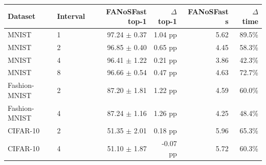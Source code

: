 \begin{tabular}{llrrrr}
\toprule
Dataset & Interval & FANoSFast top-1 & $\Delta$ top-1 & FANoSFast s & $\Delta$ time \\
\midrule
MNIST & 1 & 97.24 $\pm$ 0.37 & 1.04 pp & 5.62 & 89.5\% \\
MNIST & 2 & 96.85 $\pm$ 0.40 & 0.65 pp & 4.45 & 58.3\% \\
MNIST & 4 & 96.41 $\pm$ 1.22 & 0.21 pp & 3.86 & 42.3\% \\
MNIST & 8 & 96.66 $\pm$ 0.54 & 0.47 pp & 4.63 & 72.7\% \\
Fashion-MNIST & 2 & 87.20 $\pm$ 1.81 & 1.22 pp & 4.59 & 60.0\% \\
Fashion-MNIST & 4 & 87.24 $\pm$ 1.16 & 1.26 pp & 4.25 & 48.4\% \\
CIFAR-10 & 2 & 51.35 $\pm$ 2.01 & 0.18 pp & 5.96 & 65.3\% \\
CIFAR-10 & 4 & 51.10 $\pm$ 1.87 & -0.07 pp & 5.72 & 60.3\% \\
\bottomrule
\end{tabular}
